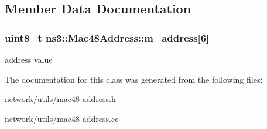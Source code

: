 \subsection{Member Data Documentation}
\subsubsection[{\texorpdfstring{m\+\_\+address}{m_address}}]{\setlength{\rightskip}{0pt plus 5cm}uint8\+\_\+t ns3\+::\+Mac48\+Address\+::m\+\_\+address\mbox{[}6\mbox{]}\hspace{0.3cm}{\ttfamily [private]}}\hypertarget{classns3_1_1Mac48Address_aa2427c5c0d9cab0de54a2a8bf5fa59c5}{}\label{classns3_1_1Mac48Address_aa2427c5c0d9cab0de54a2a8bf5fa59c5}


address value 



The documentation for this class was generated from the following files\+:\begin{DoxyCompactItemize}
\item 
network/utils/\hyperlink{mac48-address_8h}{mac48-\/address.\+h}\item 
network/utils/\hyperlink{mac48-address_8cc}{mac48-\/address.\+cc}\end{DoxyCompactItemize}
